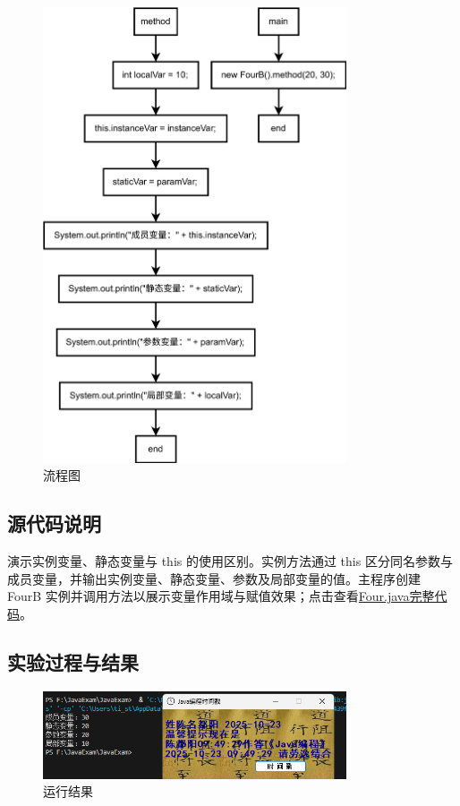\documentclass[12pt,a4paper]{article}
\begin{document}
\begin{figure}[H]
\centering
\includegraphics[width=0.8\textwidth]{fourb1.png}
\caption{流程图}
\end{figure}

\subsection*{源代码说明}
演示实例变量、静态变量与 this 的使用区别。实例方法通过 this 区分同名参数与成员变量，并输出实例变量、静态变量、参数及局部变量的值。主程序创建 FourB 实例并调用方法以展示变量作用域与赋值效果；点击查看\hyperref[sec:four]{Four.java完整代码}。

\subsection*{实验过程与结果}

\begin{figure}[H]
\centering
\includegraphics[width=0.8\textwidth]{fourb.png}
\caption{运行结果}
\end{figure}
\end{document}
